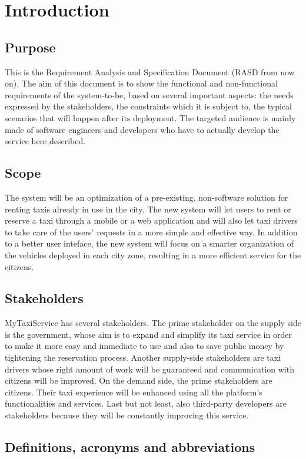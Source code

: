 \section{Introduction}

\subsection{Purpose}
This is the Requirement Analysis and Specification Document (RASD from now on). The aim of this document is to show the functional and non-functional requirements of the system-to-be, based on several important aspects: the needs expressed by the stakeholders, the constraints which it is subject to, the typical scenarios that will happen after its deployment. The targeted audience is mainly made of software engineers and developers who have to actually develop the service here described.

\subsection{Scope}
The system will be an optimization of a pre-existing, non-software solution for renting taxis already in use in the city. The new system will let users to rent or reserve a taxi through a mobile or a web application and will also let taxi drivers to take care of the users' requests in a more simple and effective way. In addition to a better user inteface, the new system will focus on a smarter organization of the vehicles deployed in each city zone, resulting in a more efficient service for the citizens.

\subsection{Stakeholders}
MyTaxiService has several stakeholders.
The prime stakeholder on the supply side is the government, whose aim is to expand and simplify its taxi service in order to make it more easy and immediate to use and also to save public money by tightening the reservation process.
Another supply-side stakeholders are taxi drivers whose right amount of work will be guaranteed and communication with citizens will be improved.
On the demand side, the prime stakeholders are citizens. Their taxi experience will be enhanced using all the platform's functionalities and services.
Last but not least, also third-party developers are stakeholders because they will be constantly improving this service.

\subsection{Definitions, acronyms and abbreviations}
